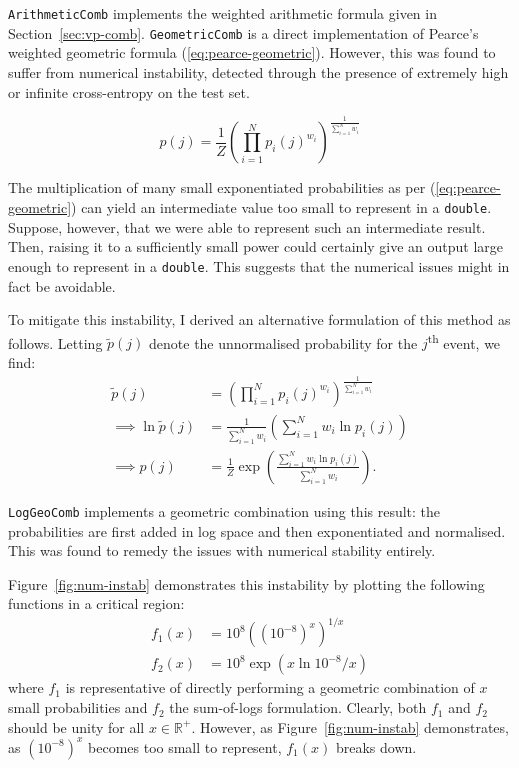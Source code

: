 \documentclass[12pt,a4paper,twoside,openright]{report}
\newcommand{\sref}[1]{Section~\ref{#1}}
\begin{document}
\texttt{ArithmeticComb} implements the weighted arithmetic formula given in
\sref{sec:vp-comb}. \texttt{GeometricComb} is a direct implementation of
Pearce's weighted geometric formula (\ref{eq:pearce-geometric}). However, this
was found to suffer from numerical instability, detected through the presence of
extremely high or infinite cross-entropy on the test set. 

\begin{equation}
p(j) = \frac{1}{Z} \left( \prod_{i = 1}^N p_i(j)^{w_i} \right)^{ \frac{1}{
\sum_{i = 1}^N w_i }} \label{eq:pearce-geometric}
\end{equation}

The multiplication of many small exponentiated probabilities as per
(\ref{eq:pearce-geometric}) can yield an intermediate value too small to
represent in a \texttt{double}. Suppose, however, that we were able to represent
such an intermediate result. Then, raising it to a sufficiently small power
could certainly give an output large enough to represent in a \texttt{double}.
This suggests that the numerical issues might in fact be avoidable.

To mitigate this instability, I derived an alternative formulation of this
method as follows. Letting $\widetilde{p}(j)$ denote the unnormalised
probability for the $j$\textsuperscript{th} event, we find:
\begin{align*}
  \widetilde{p}(j) &= \left( \prod_{i=1}^N p_i(j)^{w_i}
  \right)^{\frac{1}{\sum_{i=1}^N w_i}} \\[3mm]
  \implies \ln{\widetilde{p}(j)} &= \frac{1}{\sum_{i = 1}^N w_i} \left( \sum_{i
  = 1}^N w_i \ln{p_i(j)} \right) \\[3mm]
  \implies p(j) &= \frac{1}{Z} \exp \left( \frac{\sum_{i = 1}^N w_i \ln{ p_i(j)
  }}{ \sum_{i = 1}^N w_i } \right).
\end{align*}

\texttt{LogGeoComb} implements a geometric combination using this result: the
probabilities are first added in log space and then exponentiated and
normalised. This was found to remedy the issues with numerical stability
entirely.

Figure~\ref{fig:num-instab} demonstrates this instability by plotting the
following functions in a critical region:
\begin{align*}
  f_1(x) &= 10^8 \left( \left( 10^{-8} \right)^x \right)^{1/x} \\
  f_2(x) &= 10^8 \exp( x \ln{10^{-8}} / x)
\end{align*}
where $f_1$ is representative of directly performing a geometric combination of
$x$ small probabilities and $f_2$ the sum-of-logs formulation. Clearly, both
$f_1$ and $f_2$ should be unity for all $x \in \mathbb{R}^+$. However, as
Figure~\ref{fig:num-instab} demonstrates, as $(10^{-8})^x$ becomes too small to
represent, $f_1(x)$ breaks down.
\end{document}
